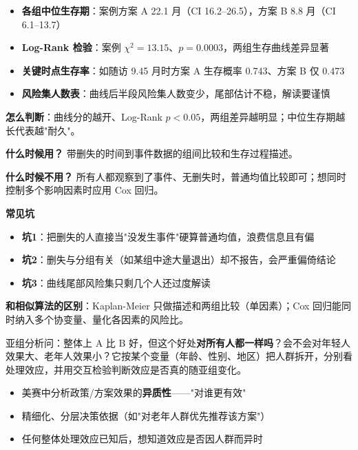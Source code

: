 \begin{algoresult}
\begin{itemize}
    \item \textbf{各组中位生存期}：案例方案 A 22.1 月（CI 16.2--26.5），方案 B 8.8 月（CI 6.1--13.7）
    \item \textbf{Log-Rank 检验}：案例 $\chi^2=13.15$、$p=0.0003$，两组生存曲线差异显著
    \item \textbf{关键时点生存率}：如随访 9.45 月时方案 A 生存概率 0.743、方案 B 仅 0.473
    \item \textbf{风险集人数表}：曲线后半段风险集人数变少，尾部估计不稳，解读要谨慎
\end{itemize}

\textbf{怎么判断}：曲线分的越开、Log-Rank $p<0.05$，两组差异越明显；中位生存期越长代表越"耐久"。
\end{algoresult}

\begin{algonotes}
\textbf{什么时候用？} 带删失的时间到事件数据的组间比较和生存过程描述。

\textbf{什么时候不用？} 所有人都观察到了事件、无删失时，普通均值比较即可；想同时控制多个影响因素时应用 Cox 回归。

\textbf{常见坑}
\begin{itemize}
    \item \textbf{坑1}：把删失的人直接当"没发生事件"硬算普通均值，浪费信息且有偏
    \item \textbf{坑2}：删失与分组有关（如某组中途大量退出）却不报告，会严重偏倚结论
    \item \textbf{坑3}：曲线尾部风险集只剩几个人还过度解读
\end{itemize}

\textbf{和相似算法的区别}：Kaplan-Meier 只做描述和两组比较（单因素）；Cox 回归能同时纳入多个协变量、量化各因素的风险比。
\end{algonotes}


\begin{algointro}
亚组分析问：整体上 A 比 B 好，但这个好处\textbf{对所有人都一样吗}？会不会对年轻人效果大、老年人效果小？它按某个变量（年龄、性别、地区）把人群拆开，分别看处理效应，并用交互检验判断效应是否真的随亚组变化。
\end{algointro}

\begin{algoscene}
\begin{itemize}
    \item 美赛中分析政策/方案效果的\textbf{异质性}——"对谁更有效"
    \item 精细化、分层决策依据（如"对老年人群优先推荐该方案"）
    \item 任何整体处理效应已知后，想知道效应是否因人群而异时
\end{itemize}
\end{algoscene}

